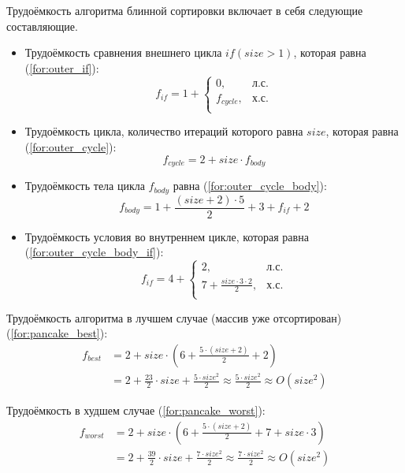 Трудоёмкость алгоритма блинной сортировки включает в себя следующие составляющие.
\begin{itemize}
	\item Трудоёмкость сравнения внешнего цикла $if  (size > 1)$, которая равна (\ref{for:outer_if}):
	\begin{equation}
		\label{for:outer_if}
		f_{if} =1 + \begin{cases}
			0, & \text{л.с.}\\
			f_{cycle}, & \text{х.с.}\\
		\end{cases}
	\end{equation}
	\item Трудоёмкость цикла, количество итераций которого равна  $size$, которая равна (\ref{for:outer_cycle}):
	\begin{equation}
		\label{for:outer_cycle}
		f_{cycle} = 2 + size \cdot f_{body}
	\end{equation}
	\item Трудоёмкость тела цикла $f_{body}$ равна (\ref{for:outer_cycle_body}):
	\begin{equation}
		\label{for:outer_cycle_body}
		f_{body} = 1 + \frac{(size + 2) \cdot 5}{2} + 3 + f_{if} + 2
	\end{equation}
	\item Трудоёмкость условия во внутреннем цикле, которая равна (\ref{for:outer_cycle_body_if}):
	\begin{equation}
		\label{for:outer_cycle_body_if}
		f_{if} = 4 + \begin{cases}
			2, & \text{л.с.}\\
			7 + \frac{size \cdot 3 \cdot 2}{2} , & \text{х.с.}\\
		\end{cases}
	\end{equation}
\end{itemize}

Трудоёмкость алгоритма в лучшем случае (массив уже отсортирован)(\ref{for:pancake_best}):
\begin{align}
	\label{for:pancake_best}
	f_{best} &= 2 + size \cdot (6 + \frac{5 \cdot (size + 2)}{2} + 2)  \\
	&= 2 + \frac{23}{2} \cdot size + \frac{5\cdot size^2}{2} \approx \frac{5\cdot size^2}{2} \approx O(size^2)
\end{align}

Трудоёмкость в худшем случае (\ref{for:pancake_worst}):
\begin{align}
	\label{for:pancake_worst}
	f_{worst} &= 2 + size \cdot (6 + \frac{5 \cdot (size + 2)}{2} + 7 + size \cdot 3)  \\
	&= 2 + \frac{39}{2} \cdot size + \frac{7\cdot size^2}{2} \approx \frac{7\cdot size^2}{2} \approx O(size^2)
\end{align}


